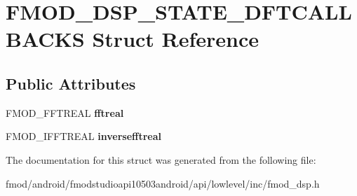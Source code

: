 \hypertarget{struct_f_m_o_d___d_s_p___s_t_a_t_e___d_f_t_c_a_l_l_b_a_c_k_s}{\section{F\+M\+O\+D\+\_\+\+D\+S\+P\+\_\+\+S\+T\+A\+T\+E\+\_\+\+D\+F\+T\+C\+A\+L\+L\+B\+A\+C\+K\+S Struct Reference}
\label{struct_f_m_o_d___d_s_p___s_t_a_t_e___d_f_t_c_a_l_l_b_a_c_k_s}
}
\subsection*{Public Attributes}
\begin{DoxyCompactItemize}
\item 
\hypertarget{struct_f_m_o_d___d_s_p___s_t_a_t_e___d_f_t_c_a_l_l_b_a_c_k_s_a528e336dbefa0633cfe2feafd82bbd75}{F\+M\+O\+D\+\_\+\+F\+F\+T\+R\+E\+A\+L {\bfseries fftreal}}\label{struct_f_m_o_d___d_s_p___s_t_a_t_e___d_f_t_c_a_l_l_b_a_c_k_s_a528e336dbefa0633cfe2feafd82bbd75}

\item 
\hypertarget{struct_f_m_o_d___d_s_p___s_t_a_t_e___d_f_t_c_a_l_l_b_a_c_k_s_a62f9ffb96667eed96be77b2d7a5cee68}{F\+M\+O\+D\+\_\+\+I\+F\+F\+T\+R\+E\+A\+L {\bfseries inversefftreal}}\label{struct_f_m_o_d___d_s_p___s_t_a_t_e___d_f_t_c_a_l_l_b_a_c_k_s_a62f9ffb96667eed96be77b2d7a5cee68}

\end{DoxyCompactItemize}


The documentation for this struct was generated from the following file\+:\begin{DoxyCompactItemize}
\item 
fmod/android/fmodstudioapi10503android/api/lowlevel/inc/fmod\+\_\+dsp.\+h\end{DoxyCompactItemize}
